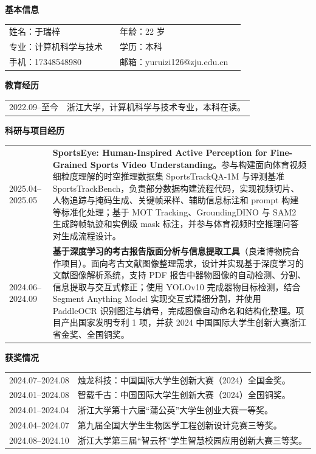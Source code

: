\cleardoublepage
{}

\begingroup
\footnotesize
\setlength{\parindent}{0pt}
\setlength{\parskip}{0pt}
\setlength{\tabcolsep}{2.5pt}
\renewcommand{\arraystretch}{1.0}

\textbf{基本信息}

\begin{tabularx}{\textwidth}{@{}lXlX@{}}
    姓名：于瑞梓 & & 年龄：22 岁 & \\
    专业：计算机科学与技术 & & 学历：本科 & \\
    手机：17348548980 & & 邮箱：yuruizi126@zju.edu.cn & \\
\end{tabularx}

\vspace{0.1em}
\textbf{教育经历}

\begin{tabularx}{\textwidth}{@{}lX@{}}
    2022.09--至今 & 浙江大学，计算机科学与技术专业，本科在读。
\end{tabularx}

\vspace{0.1em}
\textbf{科研与项目经历}

\begin{tabularx}{\textwidth}{@{}p{}X@{}}
    2025.04--2025.05 &
    \textbf{SportsEye: Human-Inspired Active Perception for Fine-Grained Sports Video Understanding}。参与构建面向体育视频细粒度理解的时空推理数据集 SportsTrackQA-1M 与评测基准 SportsTrackBench，负责部分数据构建流程代码，实现视频切片、人物追踪与掩码生成、关键帧采样、辅助信息标注和 prompt 构建等标准化处理；基于 MOT Tracking、GroundingDINO 与 SAM2 生成跨帧轨迹和实例级 mask 标注，并参与体育视频时空推理问答对生成流程设计。 \\
    2024.06--2024.09 &
    \textbf{基于深度学习的考古报告版面分析与信息提取工具}（良渚博物院合作项目）。面向考古文献图像整理需求，设计并实现基于深度学习的文献图像解析系统，支持 PDF 报告中器物图像的自动检测、分割、信息提取与交互式修正；使用 YOLOv10 完成器物目标检测，结合 Segment Anything Model 实现交互式精细分割，并使用 PaddleOCR 识别图注与编号，完成图像自动命名和结构化整理。项目产出国家发明专利 1 项，并获 2024 中国国际大学生创新大赛浙江省金奖、全国铜奖。 \\
\end{tabularx}

\vspace{0.1em}
\textbf{获奖情况}

\begin{tabularx}{\textwidth}{@{}p{}X@{}}
    2024.07--2024.08 & 烛龙科技：中国国际大学生创新大赛（2024）全国金奖。 \\
    2024.01--2024.08 & 智载千古：中国国际大学生创新大赛（2024）全国铜奖。 \\
    2024.01--2024.04 & 浙江大学第十六届“蒲公英”大学生创业大赛一等奖。 \\
    2024.04--2024.07 & 第九届全国大学生生物医学工程创新设计竞赛三等奖。 \\
    2024.08--2024.10 & 浙江大学第三届“智云杯”学生智慧校园应用创新大赛三等奖。 \\
\end{tabularx}

